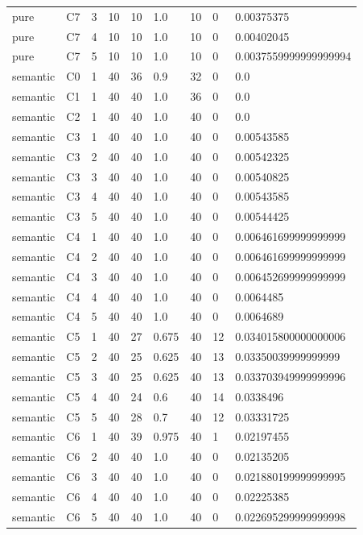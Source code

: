 \begin{tabular}{lllllllll}
pure & C7 & 3 & 10 & 10 & 1.0 & 10 & 0 & 0.00375375 \\
pure & C7 & 4 & 10 & 10 & 1.0 & 10 & 0 & 0.00402045 \\
pure & C7 & 5 & 10 & 10 & 1.0 & 10 & 0 & 0.0037559999999999994 \\
semantic & C0 & 1 & 40 & 36 & 0.9 & 32 & 0 & 0.0 \\
semantic & C1 & 1 & 40 & 40 & 1.0 & 36 & 0 & 0.0 \\
semantic & C2 & 1 & 40 & 40 & 1.0 & 40 & 0 & 0.0 \\
semantic & C3 & 1 & 40 & 40 & 1.0 & 40 & 0 & 0.00543585 \\
semantic & C3 & 2 & 40 & 40 & 1.0 & 40 & 0 & 0.00542325 \\
semantic & C3 & 3 & 40 & 40 & 1.0 & 40 & 0 & 0.00540825 \\
semantic & C3 & 4 & 40 & 40 & 1.0 & 40 & 0 & 0.00543585 \\
semantic & C3 & 5 & 40 & 40 & 1.0 & 40 & 0 & 0.00544425 \\
semantic & C4 & 1 & 40 & 40 & 1.0 & 40 & 0 & 0.006461699999999999 \\
semantic & C4 & 2 & 40 & 40 & 1.0 & 40 & 0 & 0.006461699999999999 \\
semantic & C4 & 3 & 40 & 40 & 1.0 & 40 & 0 & 0.006452699999999999 \\
semantic & C4 & 4 & 40 & 40 & 1.0 & 40 & 0 & 0.0064485 \\
semantic & C4 & 5 & 40 & 40 & 1.0 & 40 & 0 & 0.0064689 \\
semantic & C5 & 1 & 40 & 27 & 0.675 & 40 & 12 & 0.034015800000000006 \\
semantic & C5 & 2 & 40 & 25 & 0.625 & 40 & 13 & 0.03350039999999999 \\
semantic & C5 & 3 & 40 & 25 & 0.625 & 40 & 13 & 0.033703949999999996 \\
semantic & C5 & 4 & 40 & 24 & 0.6 & 40 & 14 & 0.0338496 \\
semantic & C5 & 5 & 40 & 28 & 0.7 & 40 & 12 & 0.03331725 \\
semantic & C6 & 1 & 40 & 39 & 0.975 & 40 & 1 & 0.02197455 \\
semantic & C6 & 2 & 40 & 40 & 1.0 & 40 & 0 & 0.02135205 \\
semantic & C6 & 3 & 40 & 40 & 1.0 & 40 & 0 & 0.021880199999999995 \\
semantic & C6 & 4 & 40 & 40 & 1.0 & 40 & 0 & 0.02225385 \\
semantic & C6 & 5 & 40 & 40 & 1.0 & 40 & 0 & 0.022695299999999998 \\

\end{tabular}
